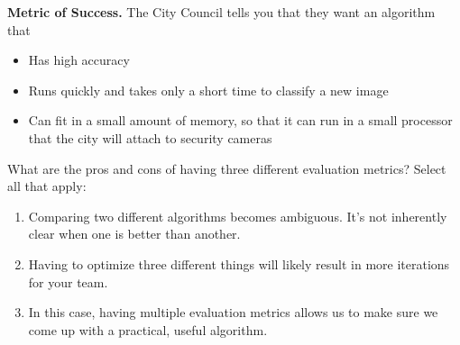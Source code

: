 \item {}
\textbf{Metric of Success.}
The City Council tells you that they want an algorithm that

\begin{itemize}
    \item Has high accuracy
    \item Runs quickly and takes only a short time to classify a new image 
    \item Can fit in a small amount of memory, so that it can run in a small processor that the city will attach to security cameras
\end{itemize}

What are the pros and cons of having three different evaluation metrics? Select all that apply:
\begin{enumerate}[label=(\alph*)]
    \item Comparing two different algorithms becomes ambiguous. It’s not inherently clear when one is better than another.
    \item Having to optimize three different things will likely result in more iterations for your team.
    \item In this case, having multiple evaluation metrics allows us to make sure we come up with a practical, useful algorithm.
\end{enumerate} 
